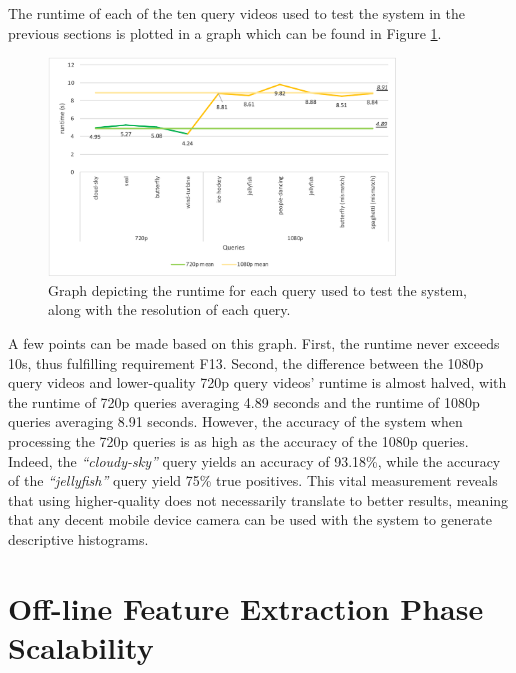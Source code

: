 The runtime of each of the ten query videos used to test the system in the previous sections is plotted in a graph which can be found in Figure \ref{fig:evaluation-runtime_plot}.

\begin{figure}[h] 
\centerline{\includegraphics[width=0.82\textwidth]{figures/evaluation/runtime_plot.png}}
\caption{\label{fig:evaluation-runtime_plot}Graph depicting the runtime for each query used to test the system, along with the resolution of each query.}
\end{figure}

A few points can be made based on this graph. First, the runtime never exceeds 10s, thus fulfilling requirement F13. Second, the difference between the 1080p query videos and lower-quality 720p query videos' runtime is almost halved, with the runtime of 720p queries averaging 4.89 seconds and the runtime of 1080p queries averaging 8.91 seconds. However, the accuracy of the system when processing the 720p queries is as high as the accuracy of the 1080p queries. Indeed, the \textit{``cloudy-sky''} query yields an accuracy of 93.18\%, while the accuracy of the \textit{``jellyfish''} query yield 75\% true positives. This vital measurement reveals that using higher-quality does not necessarily translate to better results, meaning that any decent mobile device camera can be used with the system to generate descriptive histograms.


\section{Off-line Feature Extraction Phase Scalability}

